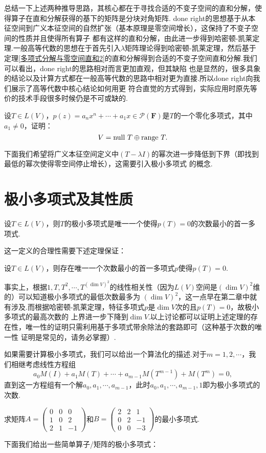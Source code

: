 总结一下上述两种推导思路，其核心都在于寻找合适的不变子空间的直和分解，使得算子在直和分解获得的基下的矩阵是分块对角矩阵.
done right的思想基于从本征空间到广义本征空间的自然扩张（基本原理是零空间增长），这保持了不变子空间的性质并且使得所有算子
都有这样的直和分解，由此进一步得到哈密顿-凯莱定理.一般高等代数的思想在于首先引入$\lambda$矩阵理论得到哈密顿-凯莱定理，然后基于
定理\ref{多项式分解与零空间直和2}的直和分解得到合适的不变子空间直和分解.我们可以看出，done right的思路相对而言更加直观，但其缺陷
也是显然的，很多具象的结论以及计算方式都在一般高等代数的思路中相对更为直接.所以done right向我们展示了高等代数中核心结论如何用更
符合直觉的方式得到，实际应用时原先等价的技术手段很多时候仍是不可或缺的.
\begin{example}
	设$T\in L(V)$，$p(z)=a_nx^n+\cdots+a_1x\in\mathcal{P}(\mathbf{F})$是$T$的一个零化多项式，其中$a_1\neq 0$，证明：
	$$V=\textup{null }T\oplus\textup{range }T.$$
\end{example}
下面我们希望将广义本征空间定义中$(T-\lambda I)$的幂次进一步降低到下界（即找到最低的幂次使得零空间停止增长），这需要引入极小多项式
的概念.

\section{极小多项式及其性质}
\begin{definition}
	设$T\in L(V)$，则$T$的极小多项式是唯一一个使得$p(T)=0$的次数最小的首一多项式.
\end{definition}
这一定义的合理性需要下述定理保证：
\begin{theorem}
	设$T\in L(V)$，则存在唯一一个次数最小的首一多项式$p$使得$p(T)=0$.
\end{theorem}
事实上，根据$1,T,T^2,\cdots,T^{(\dim V)^2}$的线性相关性（因为$L(V)$空间是$(\dim V)^2$维的）可以知道极小多项式的最低次数最多为
$(\dim V)^2$，这一点早在第二章中就有涉及.而根据哈密顿-凯莱定理，特征多项式$p$是$\dim V$次的且$p(T)=0$，故极小多项式的最高次数的
上界进一步下降到$\dim V$.以上讨论都可以证明上述定理的存在性，唯一性的证明只需利用基于多项式带余除法的套路即可（这种基于次数的唯一性
证明是常见的，请务必掌握）.

如果需要计算极小多项式，我们可以给出一个算法化的描述.对于$m=1,2,\cdots$，我们相继考虑线性方程组
$$a_0M(I)+a_1M(T)+\cdots+a_{m-1}M(T^{m-1})+M(T^m)=0,$$
直到这一方程组有一个解$a_0,a_1,\cdots,a_{m-1}$，此时$a_0,a_1,\cdots,a_{m-1},1$即为极小多项式的次数.
\begin{example}\label{求极小多项式}
	求矩阵$A=\begin{pmatrix}
		0 & 0 & 0 \\ 1 & 0 & 2 \\ 2 & 1 & -1
	\end{pmatrix}$和$B=\begin{pmatrix}
		2 & 2 & 1 \\ 0 & 2 & -1 \\ 0 & 0 & -3
	\end{pmatrix}$的最小多项式.
\end{example}
下面我们给出一些简单算子/矩阵的极小多项式：


